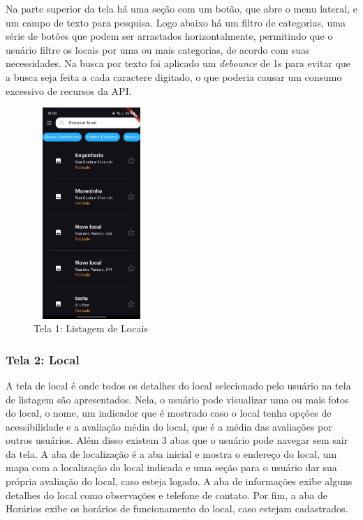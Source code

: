     Na parte superior da tela há uma seção com um botão, que abre o menu lateral, e um campo de texto para pesquisa. Logo abaixo há um filtro de categorias, uma série de botões que podem ser arrastados horizontalmente, permitindo que o usuário filtre os locais por uma ou mais categorias, de acordo com suas necessidades. Na busca por texto foi aplicado um \textit{debounce} de 1s para evitar que a busca seja feita a cada caractere digitado, o que poderia causar um consumo excessivo de recursos da API. 

    \begin{figure}[h]
        \centering
        \includegraphics[width=44mm,height=80mm]{imagens/inicial.jpg}
        \caption{\scriptsize Tela 1: Listagem de Locais}
        \footnotesize  {}
        \label{fig:tela1}
    \end{figure}

    \FloatBarrier

\subsubsection{Tela 2: Local}

    A tela de local é onde todos os detalhes do local selecionado pelo usuário na tela de listagem são apresentados. Nela, o usuário pode visualizar uma ou mais fotos do local, o nome, um indicador que é mostrado caso o local tenha opções de acessibilidade e a avaliação média do local, que é a média das avaliações por outros usuários. Além disso existem 3 abas que o usuário pode navegar sem sair da tela. A aba de localização é a aba inicial e mostra o endereço do local, um mapa com a localização do local indicada e uma seção para o usuário dar sua própria avaliação do local, caso esteja logado. A aba de informações exibe alguns detalhes do local como observações e telefone de contato. Por fim, a aba de Horários exibe os horários de funcionamento do local, caso estejam cadastrados.

